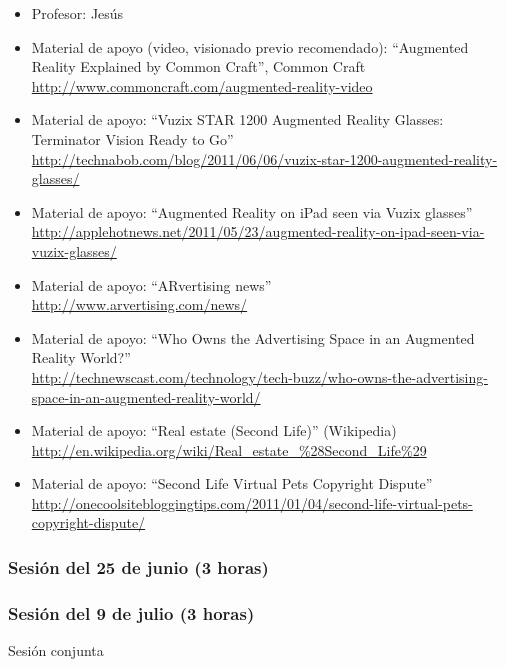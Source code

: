 \documentclass[a4paper,12pt]{article}
\begin{document}
\begin{itemize}
\item Profesor: Jesús
\item Material de apoyo (video, visionado previo recomendado): ``Augmented Reality Explained by Common Craft'', Common Craft \\
  \url{http://www.commoncraft.com/augmented-reality-video}
\item Material de apoyo: ``Vuzix STAR 1200 Augmented Reality Glasses: Terminator Vision Ready to Go'' \\
\url{http://technabob.com/blog/2011/06/06/vuzix-star-1200-augmented-reality-glasses/}
\item Material de apoyo: ``Augmented Reality on iPad seen via Vuzix glasses'' \\
  \url{http://applehotnews.net/2011/05/23/augmented-reality-on-ipad-seen-via-vuzix-glasses/}
\item Material de apoyo: ``ARvertising news'' \\
\url{http://www.arvertising.com/news/}
\item Material de apoyo: ``Who Owns the Advertising Space in an Augmented Reality World?'' \\
\url{http://technewscast.com/technology/tech-buzz/who-owns-the-advertising-space-in-an-augmented-reality-world/}
\item Material de apoyo: ``Real estate (Second Life)'' (Wikipedia) \\
\url{http://en.wikipedia.org/wiki/Real_estate_%28Second_Life%29}
\item Material de apoyo: ``Second Life Virtual Pets Copyright Dispute'' \\
\url{http://onecoolsitebloggingtips.com/2011/01/04/second-life-virtual-pets-copyright-dispute/}
\end{itemize}

\subsubsection{Sesión del 25 de junio (3 horas)}


\subsubsection{Sesión del 9 de julio (3 horas)}

Sesión conjunta

\end{document}
